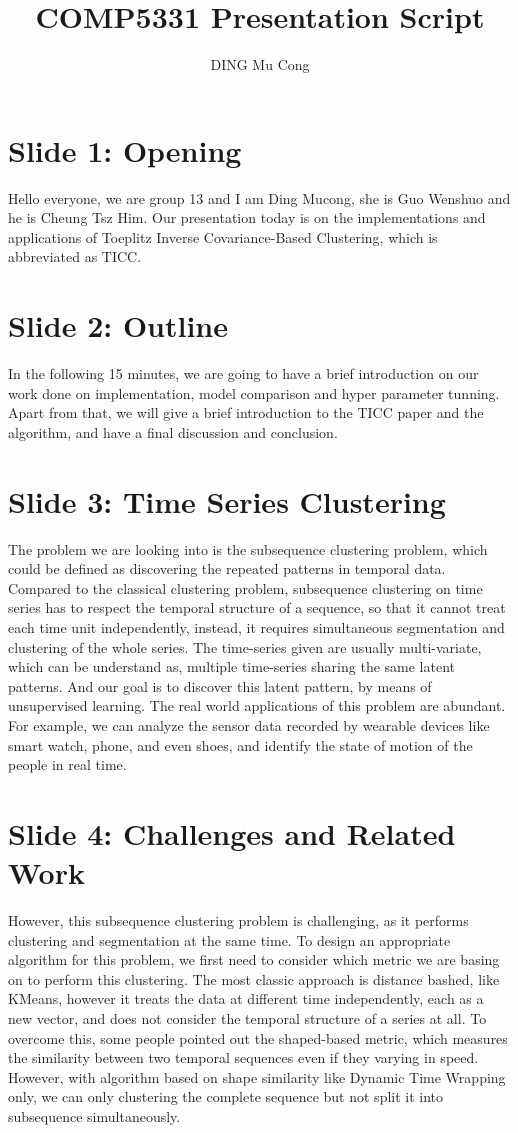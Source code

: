 \documentclass[]{article}
\title{COMP5331 Presentation Script}
\author{DING Mu Cong}
\begin{document}
\maketitle

\section{Slide 1: Opening}
Hello everyone, we are group 13 and I am Ding Mucong, she is Guo Wenshuo and he is Cheung Tsz Him. Our presentation today is on the implementations and applications of Toeplitz Inverse Covariance-Based Clustering, which is abbreviated as TICC.

\section{Slide 2: Outline}
In the following 15 minutes, we are going to have a brief introduction on our work done on implementation, model comparison and hyper parameter tunning. Apart from that, we will give a brief introduction to the TICC paper and the algorithm, and have a final discussion and conclusion.

\section{Slide 3: Time Series Clustering}
The problem we are looking into is the subsequence clustering problem, which could be defined as discovering the repeated patterns in temporal data. Compared to the classical clustering problem, subsequence clustering on time series has to respect the temporal structure of a sequence, so that it cannot treat each time unit independently, instead, it requires simultaneous segmentation and clustering of the whole series. The time-series given are usually multi-variate, which can be understand as, multiple time-series sharing the same latent patterns. And our goal is to discover this latent pattern, by means of unsupervised learning. The real world applications of this problem are abundant. For example, we can analyze the sensor data recorded by wearable devices like smart watch, phone, and even shoes, and identify the state of motion of the people in real time.

\section{Slide 4: Challenges and Related Work}
However, this subsequence clustering problem is challenging, as it performs clustering and segmentation at the same time. To design an appropriate algorithm for this problem, we first need to consider which metric we are basing on to perform this clustering. The most classic approach is distance bashed, like KMeans, however it treats the data at different time independently, each as a new vector, and does not consider the temporal structure of a series at all. To overcome this, some people pointed out the shaped-based metric, which measures the similarity between two temporal sequences even if they varying in speed. However, with algorithm based on shape similarity like Dynamic Time Wrapping only, we can only clustering the complete sequence but not split it into subsequence simultaneously.
\end{document}
